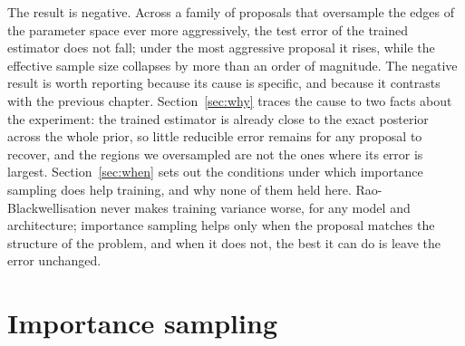 The result is negative. Across a family of proposals that oversample
the edges of the parameter space ever more aggressively, the test error
of the trained estimator does not fall; under the most aggressive
proposal it rises, while the effective sample size collapses by more
than an order of magnitude. The negative result is worth reporting
because its cause is specific, and because it contrasts with the
previous chapter. Section~\ref{sec:why} traces the cause to two facts
about the experiment: the trained estimator is already close to the
exact posterior across the whole prior, so little reducible error
remains for any proposal to recover, and the regions we oversampled are
not the ones where its error is largest. Section~\ref{sec:when} sets out
the conditions under which importance sampling does help training, and
why none of them held here. Rao-Blackwellisation never makes training variance worse, for any model and
architecture; importance sampling helps only when the proposal matches
the structure of the problem, and when it does not, the best it can do
is leave the error unchanged.



\section{Importance sampling}
\label{sec:is-basics}

